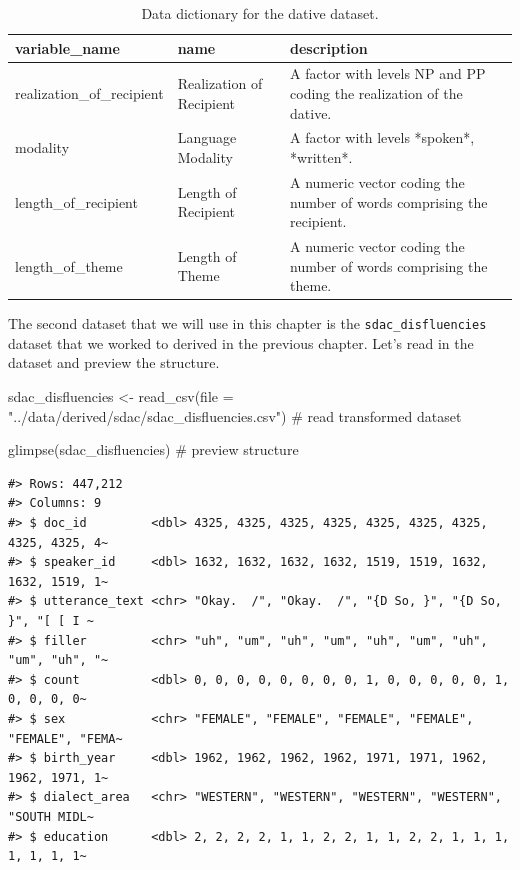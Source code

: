 \documentclass[
  letterpaper,
]{latex/krantz}
\newenvironment{Shaded}{\begin{snugshade}}{\end{snugshade}}
\newcommand{\AttributeTok}[1]{\textcolor[rgb]{0.40,0.45,0.13}{#1}}
\newcommand{\CommentTok}[1]{\textcolor[rgb]{0.37,0.37,0.37}{#1}}
\newcommand{\FunctionTok}[1]{\textcolor[rgb]{0.28,0.35,0.67}{#1}}
\newcommand{\NormalTok}[1]{\textcolor[rgb]{0.00,0.23,0.31}{#1}}
\newcommand{\OtherTok}[1]{\textcolor[rgb]{0.00,0.23,0.31}{#1}}
\newcommand{\StringTok}[1]{\textcolor[rgb]{0.13,0.47,0.30}{#1}}
\begin{document}
\hypertarget{tbl-i-dative-dictionary}{}
\begin{table}
\caption{\label{tbl-i-dative-dictionary}Data dictionary for the dative dataset. }\tabularnewline

\centering
\begin{tabular}{lll}
\toprule
variable\_name & name & description\\
\midrule
realization\_of\_recipient & Realization of Recipient & A factor with levels NP and PP coding the realization of the dative.\\
modality & Language Modality & A factor with levels *spoken*, *written*.\\
length\_of\_recipient & Length of Recipient & A numeric vector coding the number of words comprising the recipient.\\
length\_of\_theme & Length of Theme & A numeric vector coding the number of words comprising the theme.\\
\bottomrule
\end{tabular}
\end{table}

The second dataset that we will use in this chapter is the
\texttt{sdac\_disfluencies} dataset that we worked to derived in the
previous chapter. Let's read in the dataset and preview the structure.

\begin{Shaded}
\begin{Highlighting}[]
\NormalTok{sdac\_disfluencies }\OtherTok{\textless{}{-}} 
  \FunctionTok{read\_csv}\NormalTok{(}\AttributeTok{file =} \StringTok{"../data/derived/sdac/sdac\_disfluencies.csv"}\NormalTok{) }\CommentTok{\# read transformed dataset}

\FunctionTok{glimpse}\NormalTok{(sdac\_disfluencies) }\CommentTok{\# preview structure}
\end{Highlighting}
\end{Shaded}

\begin{verbatim}
#> Rows: 447,212
#> Columns: 9
#> $ doc_id         <dbl> 4325, 4325, 4325, 4325, 4325, 4325, 4325, 4325, 4325, 4~
#> $ speaker_id     <dbl> 1632, 1632, 1632, 1632, 1519, 1519, 1632, 1632, 1519, 1~
#> $ utterance_text <chr> "Okay.  /", "Okay.  /", "{D So, }", "{D So, }", "[ [ I ~
#> $ filler         <chr> "uh", "um", "uh", "um", "uh", "um", "uh", "um", "uh", "~
#> $ count          <dbl> 0, 0, 0, 0, 0, 0, 0, 0, 1, 0, 0, 0, 0, 0, 1, 0, 0, 0, 0~
#> $ sex            <chr> "FEMALE", "FEMALE", "FEMALE", "FEMALE", "FEMALE", "FEMA~
#> $ birth_year     <dbl> 1962, 1962, 1962, 1962, 1971, 1971, 1962, 1962, 1971, 1~
#> $ dialect_area   <chr> "WESTERN", "WESTERN", "WESTERN", "WESTERN", "SOUTH MIDL~
#> $ education      <dbl> 2, 2, 2, 2, 1, 1, 2, 2, 1, 1, 2, 2, 1, 1, 1, 1, 1, 1, 1~
\end{verbatim}
\end{document}
